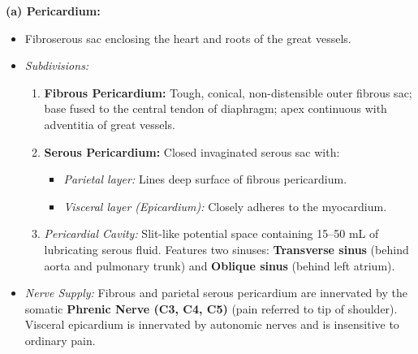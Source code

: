 \documentclass[11pt,a4paper]{article}
\begin{document}
\begin{ansbox}
\textbf{(a) Pericardium:}
\begin{itemize}[leftmargin=*]
    \item Fibroserous sac enclosing the heart and roots of the great vessels.
    \item \textit{Subdivisions:}
    \begin{enumerate}
        \item \textbf{Fibrous Pericardium:} Tough, conical, non-distensible outer fibrous sac; base fused to the central tendon of diaphragm; apex continuous with adventitia of great vessels.
        \item \textbf{Serous Pericardium:} Closed invaginated serous sac with:
        \begin{itemize}
            \item \textit{Parietal layer:} Lines deep surface of fibrous pericardium.
            \item \textit{Visceral layer (Epicardium):} Closely adheres to the myocardium.
        \end{itemize}
        \item \textit{Pericardial Cavity:} Slit-like potential space containing 15--50 mL of lubricating serous fluid. Features two sinuses: \textbf{Transverse sinus} (behind aorta and pulmonary trunk) and \textbf{Oblique sinus} (behind left atrium).
    \end{enumerate}
    \item \textit{Nerve Supply:} Fibrous and parietal serous pericardium are innervated by the somatic \textbf{Phrenic Nerve (C3, C4, C5)} (pain referred to tip of shoulder). Visceral epicardium is innervated by autonomic nerves and is insensitive to ordinary pain.
\end{itemize}


\end{ansbox}
\end{document}
